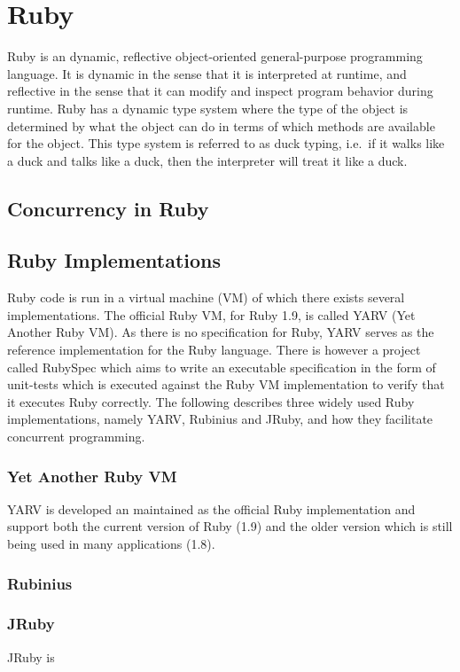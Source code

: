 \section{Ruby} %
\label{sec:ruby}

Ruby is an dynamic, reflective object-oriented general-purpose programming
language. It is dynamic in the sense that it is interpreted at runtime, and
reflective in the sense that it can modify and inspect program behavior during
runtime.  Ruby has a dynamic type system where the type of the object is
determined by what the object can do in terms of which methods are available
for the object. This type system is referred to as duck typing, i.e.\ if it
walks like a duck and talks like a duck, then the interpreter will treat it
like a duck.

\subsection{Concurrency in Ruby}

\subsection{Ruby Implementations}
Ruby code is run in a virtual machine (VM) of which there exists several
implementations. The official Ruby VM, for Ruby 1.9, is called YARV (Yet 
Another Ruby VM). As there is no specification for Ruby, YARV serves as
the reference implementation for the Ruby language.  There is however a
project called RubySpec which aims to write an executable specification in the
form of unit-tests which is executed against the Ruby VM implementation to
verify that it executes Ruby correctly. The following describes three widely
used Ruby implementations, namely YARV, Rubinius and JRuby, and how they
facilitate concurrent programming.

\subsubsection{Yet Another Ruby VM}
YARV is developed an maintained as the official Ruby implementation and
support both the current version of Ruby (1.9) and the older version which is
still being used in many applications (1.8). 

\subsubsection{Rubinius}


\subsubsection{JRuby}
JRuby is 


